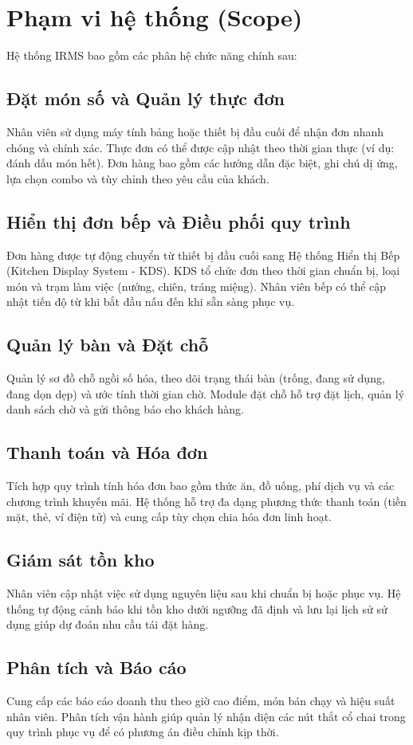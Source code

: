\section{Phạm vi hệ thống (Scope)}

Hệ thống IRMS bao gồm các phân hệ chức năng chính sau:

\subsection{Đặt món số và Quản lý thực đơn}
Nhân viên sử dụng máy tính bảng hoặc thiết bị đầu cuối để nhận đơn nhanh chóng và chính xác. Thực đơn có thể được cập nhật theo thời gian thực (ví dụ: đánh dấu món hết). Đơn hàng bao gồm các hướng dẫn đặc biệt, ghi chú dị ứng, lựa chọn combo và tùy chỉnh theo yêu cầu của khách.

\subsection{Hiển thị đơn bếp và Điều phối quy trình}
Đơn hàng được tự động chuyển từ thiết bị đầu cuối sang Hệ thống Hiển thị Bếp (Kitchen Display System - KDS). KDS tổ chức đơn theo thời gian chuẩn bị, loại món và trạm làm việc (nướng, chiên, tráng miệng). Nhân viên bếp có thể cập nhật tiến độ từ khi bắt đầu nấu đến khi sẵn sàng phục vụ.

\subsection{Quản lý bàn và Đặt chỗ}
Quản lý sơ đồ chỗ ngồi số hóa, theo dõi trạng thái bàn (trống, đang sử dụng, đang dọn dẹp) và ước tính thời gian chờ. Module đặt chỗ hỗ trợ đặt lịch, quản lý danh sách chờ và gửi thông báo cho khách hàng.

\subsection{Thanh toán và Hóa đơn}
Tích hợp quy trình tính hóa đơn bao gồm thức ăn, đồ uống, phí dịch vụ và các chương trình khuyến mãi. Hệ thống hỗ trợ đa dạng phương thức thanh toán (tiền mặt, thẻ, ví điện tử) và cung cấp tùy chọn chia hóa đơn linh hoạt.

\subsection{Giám sát tồn kho}
Nhân viên cập nhật việc sử dụng nguyên liệu sau khi chuẩn bị hoặc phục vụ. Hệ thống tự động cảnh báo khi tồn kho dưới ngưỡng đã định và lưu lại lịch sử sử dụng giúp dự đoán nhu cầu tái đặt hàng.

\subsection{Phân tích và Báo cáo}
Cung cấp các báo cáo doanh thu theo giờ cao điểm, món bán chạy và hiệu suất nhân viên. Phân tích vận hành giúp quản lý nhận diện các nút thắt cổ chai trong quy trình phục vụ để có phương án điều chỉnh kịp thời.

